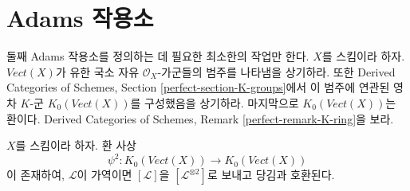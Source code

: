 \section{Adams 작용소}
\label{section-adams}

\noindent
둘째 Adams 작용소를 정의하는 데 필요한 최소한의 작업만 한다.
$X$를 스킴이라 하자. $\textit{Vect}(X)$가 유한 국소 자유
$\mathcal{O}_X$-가군들의 범주를 나타냄을 상기하라. 또한 Derived
Categories of Schemes, Section \ref{perfect-section-K-groups}에서 이
범주에 연관된 영차 $K$-군 $K_0(\textit{Vect}(X))$를 구성했음을
상기하라. 마지막으로 $K_0(\textit{Vect}(X))$는 환이다. Derived
Categories of Schemes, Remark \ref{perfect-remark-K-ring}을 보라.

\begin{lemma}
\label{lemma-second-adams-operator}
$X$를 스킴이라 하자. 환 사상
$$
\psi^2 :
K_0(\textit{Vect}(X))
\longrightarrow
K_0(\textit{Vect}(X))
$$
이 존재하여, $\mathcal{L}$이 가역이면 $[\mathcal{L}]$을
$[\mathcal{L}^{\otimes 2}]$로 보내고 당김과 호환된다.
\end{lemma}

